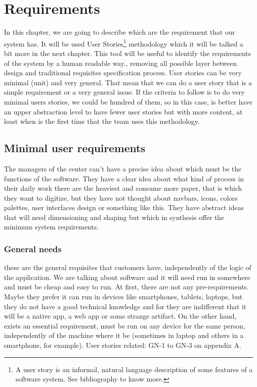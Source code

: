 \chapter{Requirements}

In this chapter, we are going to describe which are the requirement that our system has.
It will be used User Stories\footnote{A user story is an informal, natural language
description of some features of a software system. See bibliography to know more.}
methodology which it will be talked a bit more in the next chapter.
This tool will be useful to identify the requirements of the system by a
human readable way., removing all possible layer between design and traditional
requisites specification process.
\intro
User stories can be very minimal (unit) and very general. That mean that we
can do a user story that is a simple requirement or a very general issue.
If the criteria to follow is to do very minimal users stories, we could be
hundred of them, so in this case, is better have an upper abstraction level
to have fewer user stories but with more content, at least when is the
first time that the team uses this methodology.

\section{Minimal user requirements}

The managers of the center can't have a precise idea about which must be the
functions of the software. They have a clear idea about what kind of process in
their daily work there are the heaviest and consume more paper, that is which
they want to digitize, but they have not thought about navbars, icons, colors palettes,
user interfaces design or something like this.  They have abstract ideas that will
need dimensioning and shaping but which in synthesis offer the minimum system requirements.

\subsection{General needs}

these are the general requisites that customers have, independently of the logic of the application.
We are talking about software and it will need run in somewhere and must be cheap
and easy to run.
At first, there are not any pre-requirements. Maybe they prefer it can run in
devices like smartphones, tablets, laptops,
but they do not have a good technical knowledge and for they are indifferent that
it will be a native app, a web app or some strange artifact.
\intro
On the other hand, exists an essential requirement, must be run on any device for
the same person, independently of the machine where it be (sometimes in laptop
and others in a smartphone, for example).
\intro
User stories related: GN-1 to GN-3 on appendix A.



